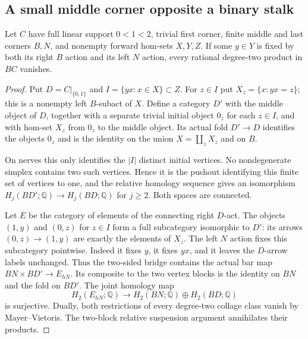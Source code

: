 \subsection{A small middle corner opposite a binary stalk}

\begin{lemma}
\label{CP2:A-linear-joint-fixed-middle-arrow}
Let $C$ have full linear support $0<1<2$, trivial first
corner, finite middle and last corners $B,N$, and nonempty
forward hom-sets $X,Y,Z$.  If some $y\in Y$ is fixed by
both its right $B$ action and its left $N$ action, every
rational degree-two product in $BC$ vanishes.
\end{lemma}
\begin{proof}
Put $D=C|_{\{0,1\}}$ and $I=\{yx:x\in X\}\subset Z$.
For $z\in I$ put $X_z=\{x:yx=z\}$; this is a nonempty
left $B$-subact of $X$.  Define a category $D'$ with the
middle object of $D$, together with a separate trivial
initial object $0_z$ for each $z\in I$, and with hom-set
$X_z$ from $0_z$ to the middle object.  Its actual fold
$D'\to D$ identifies the objects $0_z$ and is the identity
on the union $X=\coprod_zX_z$ and on $B$.

On nerves this only identifies the $|I|$ distinct initial
vertices.  No nondegenerate simplex contains two such
vertices.  Hence it is the pushout identifying this finite
set of vertices to one, and the relative homology sequence
gives an isomorphism $H_j(BD';\mathbb Q)\to H_j(BD;\mathbb Q)$
for $j\geq2$.  Both spaces are connected.

Let $E$ be the category of elements of the connecting
right $D$-act.  The objects $(1,y)$ and $(0,z)$ for $z\in I$
form a full subcategory isomorphic to $D'$: its arrows
$(0,z)\to(1,y)$ are exactly the elements of $X_z$.
The left $N$ action fixes this subcategory pointwise.
Indeed it fixes $y$, it fixes $yx$, and it leaves the
$D$-arrow labels unchanged.  Thus the two-sided bridge
contains the actual bar map $BN\times BD'\to E_{hN}$.
Its composite to the two vertex blocks is the identity
on $BN$ and the fold on $BD'$.  The joint homology map
\[
 H_2(E_{hN};\mathbb Q)\longrightarrow
 H_2(BN;\mathbb Q)\oplus H_2(BD;\mathbb Q)
\]
is surjective.  Dually, both restrictions of every
degree-two collage class vanish by Mayer--Vietoris.
The two-block relative suspension argument annihilates
their products.
\end{proof}

